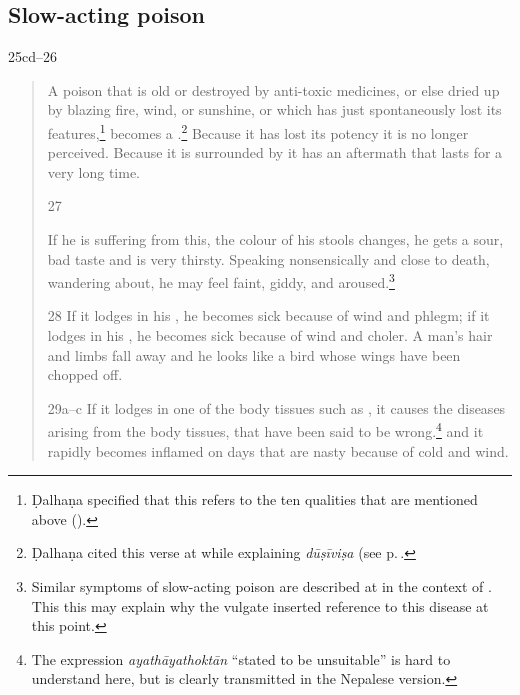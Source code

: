 \begin{translation}
    \subsection{Slow-acting poison}
    \item[25cd--26]  
    \begin{verse}
        A poison that is old or destroyed by anti-toxic medicines, or
else dried up by blazing fire, wind, or sunshine, or which has
just spontaneously lost its features,\footnote{Ḍalhaṇa
    specified that this refers to the ten qualities that are
    mentioned above ().} becomes a
    .\footnote{Ḍalhaṇa cited
        this verse at  while explaining
        \emph{dūṣīviṣa} (see p.\,\pageref{dusivisa}.} Because it has
        lost its potency it is no longer perceived.  Because it is
        surrounded by  it has an aftermath that
        lasts for a very long time.
        
        \item[27] 
        
If he is suffering from this, the colour of his stools changes, he
gets a sour, bad taste and is very thirsty. Speaking nonsensically and
close to death, wandering about, he may feel faint, giddy, and
aroused.\footnote{Similar symptoms of slow-acting poison are described
    at  in the context of 
    .  This this may explain why the
    vulgate inserted reference to this disease at this point.}
        
        
        



        \item[28]
        If it lodges in his , he becomes sick because of wind 
        and phlegm; if it lodges in his , he becomes sick 
        because of  wind and 
        choler.  A man's hair and limbs fall away and he looks like a
        bird whose wings have been chopped off.
        \item[29a--c]
        If it lodges in one of the body tissues such as 
        , it causes the diseases arising
        from the body tissues, that have been said to be wrong.\footnote{The 
        expression \emph{ayathāyathoktān} “stated to be unsuitable” is hard to 
        understand here, but is clearly transmitted in the Nepalese version.}
        and it rapidly becomes inflamed on days that are nasty
        because of cold and wind.
        

\end{verse}
\end{translation}
